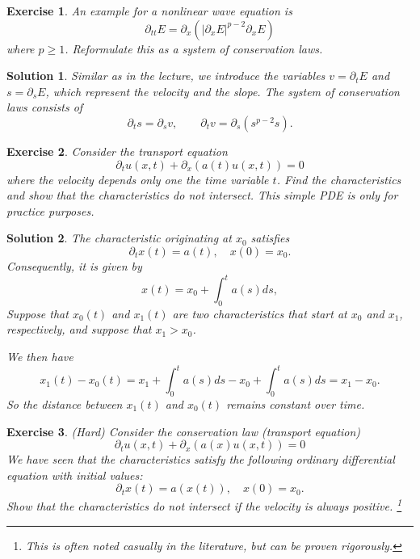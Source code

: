 \documentclass[10pt,letterpaper]{article}
\theoremstyle{break}
\newtheorem{exercise}{Exercise}
\newtheorem{solution}{Solution}
\begin{document}
\begin{exercise}
    An example for a nonlinear wave equation is
    $$
        \partial_{tt} E = \partial_{x} \left( |\partial_x E|^{p-2} \partial_x E \right)
    $$
    where $p \geq 1$. Reformulate this as a system of conservation laws.
\end{exercise}

\begin{solution}
    Similar as in the lecture, we introduce the variables $v = \partial_t E$ and $s = \partial_s E$, which represent the velocity and the slope.
    The system of conservation laws consists of 
    $$
        \partial_t s = \partial_s v,
        \qquad
        \partial_t v = \partial_s \left( s^{p-2} s \right).
    $$
\end{solution}




\begin{exercise}
    Consider the transport equation 
    $$
        \partial_t u(x,t) + \partial_x\left( a(t) u(x,t) \right) = 0
    $$
    where the velocity depends only one the time variable $t$.
    Find the characteristics and show that the characteristics do not intersect.
    \textit{This simple PDE is only for practice purposes.}
\end{exercise}

\begin{solution}
    The characteristic originating at $x_0$ satisfies 
    $$
        \partial_t x(t) = a(t), \quad x(0) = x_0.
    $$
    Consequently, it is given by 
    $$
        x(t) = x_0 + \int_0^t a(s) ds,
    $$
    Suppose that $x_0(t)$ and $x_1(t)$ are two characteristics that start at $x_0$ and $x_1$, respectively, and suppose that $x_1 > x_0$.

    We then have 
    $$
        x_1(t) - x_0(t)
        =
        x_1 + \int_0^t a(s) ds - x_0 + \int_0^t a(s) ds
        =
        x_1 - x_0
        .
    $$
    So the distance between $x_1(t)$ and $x_0(t)$ remains constant over time.
\end{solution}







\begin{exercise}
    (Hard) Consider the conservation law (transport equation)
    $$
        \partial_t u(x,t) + \partial_x\left( a(x) u(x,t) \right) = 0
    $$
    We have seen that the characteristics satisfy the following ordinary differential equation with initial values:
    $$
        \partial_t x(t) = a(x(t)), \quad x(0) = x_0.
    $$
    Show that the characteristics do not intersect if the velocity is always positive. \footnote{This is often noted casually in the literature, but can be proven rigorously.}
\end{exercise}
\end{document}

